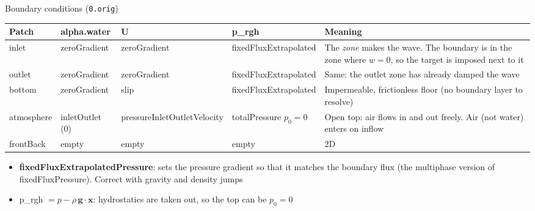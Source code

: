 \documentclass[aspectratio=169,10pt]{beamer}
\newcommand{\key}[1]{{\leavevmode\ttfamily\color{sea}#1}}
\begin{document}
\begin{frame}{Boundary conditions (\texttt{0.orig})}
  \footnotesize
  \renewcommand{\arraystretch}{1.15}
  \begin{tabularx}{\linewidth}{@{}P{1.8cm}P{2.1cm}P{2.3cm}P{3.0cm}L@{}}
    \toprule
    Patch & \key{alpha.water} & \key{U} & \key{p\_rgh} & Meaning \\
    \midrule
    \key{inlet}  & zeroGradient & zeroGradient & fixedFluxExtrapolated & The \emph{zone} makes the wave. The boundary is in the zone where $w = 0$, so the target is imposed next to it \\
    \key{outlet} & zeroGradient & zeroGradient & fixedFluxExtrapolated & Same: the outlet zone has already damped the wave \\
    \key{bottom} & zeroGradient & slip & fixedFluxExtrapolated & Impermeable, frictionless floor (no boundary layer to resolve) \\
    \key{atmosphere} & inletOutlet (0) & pressureInlet\-Outlet\-Velocity & totalPressure $p_0=0$ & Open top: air flows in and out freely. Air (not water) enters on inflow \\
    \key{frontBack} & empty & empty & empty & 2D \\
    \bottomrule
  \end{tabularx}

  \vspace{2mm}\small
  \begin{itemize}
    \item \textbf{fixedFluxExtrapolatedPressure}: sets the pressure gradient so that it matches the
          boundary flux (the multiphase version of fixedFluxPressure). Correct with gravity and density jumps
    \item \key{p\_rgh} $= p - \rho\,\mathbf{g}\cdot\mathbf{x}$: hydrostatics are taken out, so the top can be $p_0=0$
  \end{itemize}
\end{frame}
\end{document}
